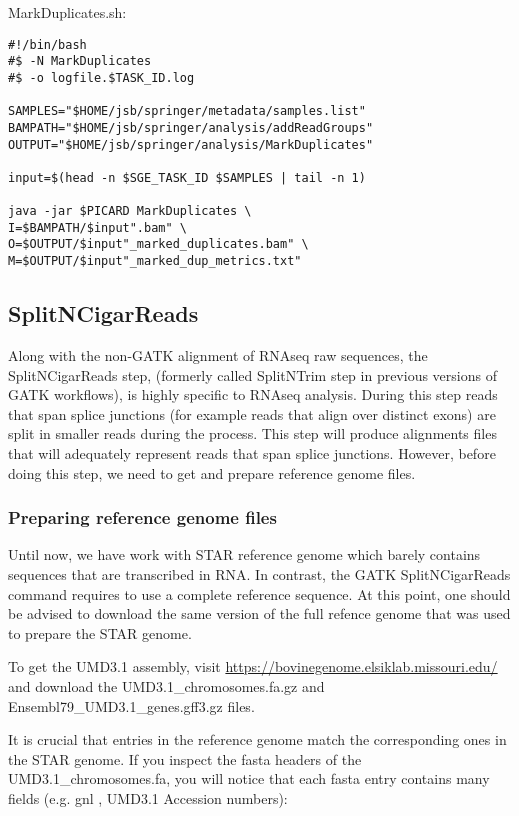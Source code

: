 \noindent MarkDuplicates.sh:
\begin{verbatim}
#!/bin/bash
#$ -N MarkDuplicates
#$ -o logfile.$TASK_ID.log

SAMPLES="$HOME/jsb/springer/metadata/samples.list"
BAMPATH="$HOME/jsb/springer/analysis/addReadGroups"
OUTPUT="$HOME/jsb/springer/analysis/MarkDuplicates"

input=$(head -n $SGE_TASK_ID $SAMPLES | tail -n 1)

java -jar $PICARD MarkDuplicates \
I=$BAMPATH/$input".bam" \
O=$OUTPUT/$input"_marked_duplicates.bam" \
M=$OUTPUT/$input"_marked_dup_metrics.txt"
\end{verbatim}

\subsection{SplitNCigarReads}

Along with the non-GATK alignment of RNAseq raw sequences, the SplitNCigarReads step, (formerly called SplitNTrim step in previous versions of GATK workflows), is highly specific to RNAseq analysis. During this step reads that span splice junctions (for example reads that align over distinct exons) are split in smaller reads during the process. This step will produce alignments files that will adequately represent reads that span splice junctions. However, before doing this step, we need to get and prepare reference genome files.


\subsubsection{Preparing reference genome files}

Until now, we have work with STAR reference genome which barely contains sequences that are transcribed in RNA. In contrast, the GATK SplitNCigarReads command requires to use a complete reference sequence. At this point, one should be advised to download the same version of the full refence genome that was used to prepare the STAR genome.

To get the UMD3.1 assembly, visit \href{https://bovinegenome.elsiklab.missouri.edu/}{https://bovinegenome.elsiklab.missouri.edu/} and download the UMD3.1\_chromosomes.fa.gz and Ensembl79\_UMD3.1\_genes.gff3.gz files.


It is crucial that entries in the reference genome match the corresponding ones in the STAR genome. If you inspect the fasta headers of the UMD3.1\_chromosomes.fa, you will notice that each fasta entry contains many fields (e.g. gnl , UMD3.1 Accession numbers):

